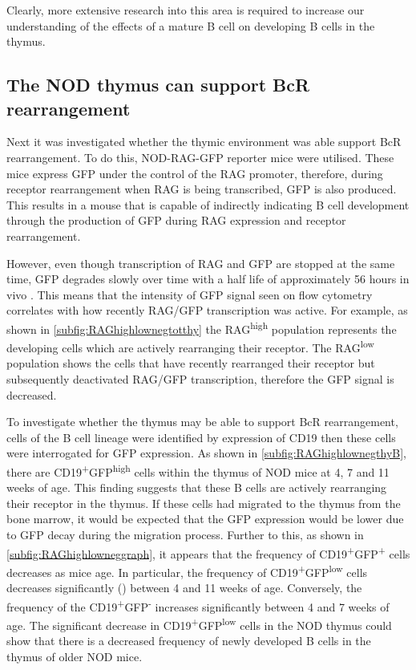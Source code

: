 Clearly, more extensive research into this area is required to increase our understanding of the effects of a mature B cell on developing B cells in the thymus.

\subsection{The NOD thymus can support BcR rearrangement}

Next it was investigated whether the thymic environment was able support BcR rearrangement.
To do this, NOD-RAG-GFP reporter mice were utilised.
These mice express GFP under the control of the RAG promoter, therefore, during receptor rearrangement when RAG is being transcribed, GFP is also produced.
This results in a mouse that is capable of indirectly indicating B cell development through the production of GFP during RAG expression and receptor rearrangement.

However, even though transcription of RAG and GFP are stopped at the same time, GFP degrades slowly over time with a half life of approximately 56 hours in vivo \citep{McCaughtry2007}.
This means that the intensity of GFP signal seen on flow cytometry correlates with how recently RAG/GFP transcription was active.
For example, as shown in \cref{subfig:RAGhighlownegtotthy} the RAG\textsuperscript{high} population represents the developing cells which are actively rearranging their receptor.
The RAG\textsuperscript{low} population shows the cells that have recently rearranged their receptor but subsequently deactivated RAG/GFP transcription, therefore the GFP signal is decreased.

To investigate whether the thymus may be able to support BcR rearrangement, cells of the B cell lineage were identified by expression of CD19 then these cells were interrogated for GFP expression.
As shown in \cref{subfig:RAGhighlownegthyB}, there are CD19\textsuperscript{+}GFP\textsuperscript{high} cells within the thymus of NOD mice at 4, 7 and 11 weeks of age.
This finding suggests that these B cells are actively rearranging their receptor in the thymus.
If these cells had migrated to the thymus from the bone marrow, it would be expected that the GFP expression would be lower due to GFP decay during the migration process.
Further to this, as shown in \cref{subfig:RAGhighlowneggraph}, it appears that the frequency of CD19\textsuperscript{+}GFP\textsuperscript{+} cells decreases as mice age.
In particular, the frequency of CD19\textsuperscript{+}GFP\textsuperscript{low} cells decreases significantly () between 4 and 11 weeks of age.
Conversely, the frequency of the CD19\textsuperscript{+}GFP\textsuperscript{-} increases significantly between 4 and 7 weeks of age.
The significant decrease in CD19\textsuperscript{+}GFP\textsuperscript{low} cells in the NOD thymus could show that there is a decreased frequency of newly developed B cells in the thymus of older NOD mice.

